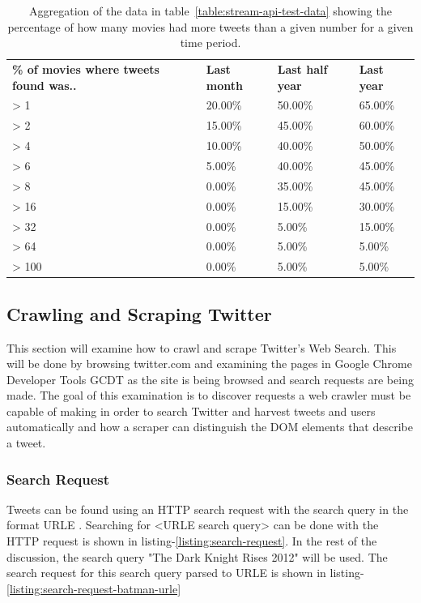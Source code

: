 \begin{table}[H]
\centering
\begin{tabularx}{5.3\textwidth}{ |p{7cm}|p{1cm}|p{1cm}|p{1cm}| }
\textbf{\% of movies where tweets found was..} & \textbf{Last month} & \textbf{Last half year} & \textbf{Last year}\\
  \cline{0-3}
> 1 & 20.00\% & 50.00\% & 65.00\%\\
  \cline{0-3}
> 2 & 15.00\% & 45.00\% & 60.00\%\\
  \cline{0-3}
> 4 & 10.00\% & 40.00\% & 50.00\%\\
  \cline{0-3}
> 6 & 5.00\% & 40.00\% & 45.00\%\\
  \cline{0-3}
> 8 & 0.00\% & 35.00\% & 45.00\%\\
  \cline{0-3}
> 16 & 0.00\% & 15.00\% & 30.00\%\\
  \cline{0-3}
> 32 & 0.00\% & 5.00\% & 15.00\%\\
  \cline{0-3}
> 64 & 0.00\% & 5.00\% & 5.00\%\\
  \cline{0-3}
> 100 & 0.00\% & 5.00\% & 5.00\%
\end{tabularx}
\caption[Stream API capability test aggregation]{Aggregation of the data in table~\ref{table:stream-api-test-data} showing the percentage of how many movies had more tweets than a given number for a given time period.}
\label{table:stream-api-test-data-aggregate}
\end{table}




\subsection{Crawling and Scraping Twitter}\label{sec:pre-twitter-crawl-scrape}
This section will examine how to crawl and scrape Twitter's Web Search. This will be done by browsing twitter.com and examining the pages in Google Chrome Developer Tools GCDT\cite{gcdt} as the site is being browsed and search requests are being made. The goal of this examination is to discover requests a web crawler must be capable of making in order to search Twitter and harvest tweets and users automatically and how a scraper can distinguish the DOM elements that describe a tweet.


\subsubsection{Search Request}
Tweets can be found using an HTTP search request with the search query in the format URLE \cite{w3-urle-ref}.
Searching for <URLE search query> can be done with the HTTP request is shown in listing-\ref{listing:search-request}.
In the rest of the discussion, the search query "The Dark Knight Rises 2012" will be used. The search request for this search query parsed to URLE is shown in listing-\ref{listing:search-request-batman-urle}

